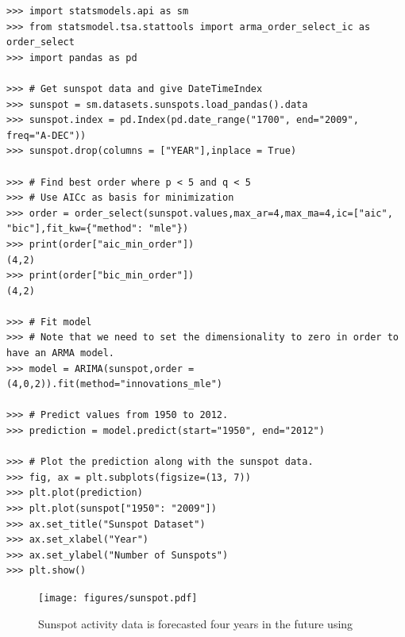 \begin{lstlisting}
>>> import statsmodels.api as sm
>>> from statsmodel.tsa.stattools import arma_order_select_ic as order_select
>>> import pandas as pd

>>> # Get sunspot data and give DateTimeIndex
>>> sunspot = sm.datasets.sunspots.load_pandas().data
>>> sunspot.index = pd.Index(pd.date_range("1700", end="2009", freq="A-DEC"))
>>> sunspot.drop(columns = ["YEAR"],inplace = True)

>>> # Find best order where p < 5 and q < 5
>>> # Use AICc as basis for minimization
>>> order = order_select(sunspot.values,max_ar=4,max_ma=4,ic=["aic", "bic"],fit_kw={"method": "mle"})
>>> print(order["aic_min_order"])
(4,2)
>>> print(order["bic_min_order"])
(4,2)

>>> # Fit model
>>> # Note that we need to set the dimensionality to zero in order to have an ARMA model.
>>> model = ARIMA(sunspot,order = (4,0,2)).fit(method="innovations_mle")

>>> # Predict values from 1950 to 2012.
>>> prediction = model.predict(start="1950", end="2012")

>>> # Plot the prediction along with the sunspot data.
>>> fig, ax = plt.subplots(figsize=(13, 7))
>>> plt.plot(prediction)
>>> plt.plot(sunspot["1950": "2009"])
>>> ax.set_title("Sunspot Dataset")
>>> ax.set_xlabel("Year")
>>> ax.set_ylabel("Number of Sunspots")
>>> plt.show()
\end{lstlisting}


\begin{figure}[H]
\centering
\texttt{[image: figures/sunspot.pdf]}
\caption{Sunspot activity data is forecasted four years in the future using }
\label{fig:sunspot}
\end{figure}

